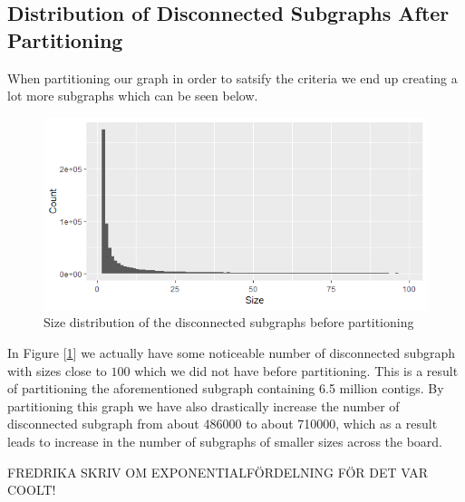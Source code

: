\documentclass[a4paper,10pt]{article}
\newcommand\bref[1]{[\ref{#1}]}
\begin{document}
\subsection{Distribution of Disconnected Subgraphs After Partitioning}

When partitioning our graph in order to satsify the criteria we end up creating a lot more subgraphs which can be seen below.

\begin{figure}[H]
	\centering
	\includegraphics[width=0.85\linewidth]{sizesafter.png}
	\caption{Size distribution of the disconnected subgraphs before partitioning}
	\label{fig:sizeafter}
\end{figure}

In Figure \bref{fig:sizeafter} we actually have some noticeable number of disconnected subgraph with sizes close to $100$ which we did not have before partitioning. This is a result of partitioning the aforementioned subgraph containing 6.5 million contigs. By partitioning this graph we have also drastically increase the number of disconnected subgraph from about 486000 to about 710000, which as a result leads to increase in the number of subgraphs of smaller sizes across the board. 

\bigskip

FREDRIKA SKRIV OM EXPONENTIALFÖRDELNING FÖR DET VAR COOLT!
\end{document}
